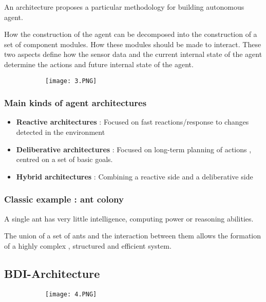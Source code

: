 \documentclass{article}
\begin{document}
An architecture proposes a particular methodology for building autonomous agent.

How the construction of the agent can be decomposed into the construction of a set of component modules.
How these modules should be made to interact.
These two aspects define how the sensor data and the current internal state of the agent determine the actions and future internal state of the agent.

\begin{figure}[ht!]
  \centering
  \begin{subfigure}[b]{0.6\linewidth}
    \texttt{[image: 3.PNG]}
  \end{subfigure}
\end{figure}

\subsubsection{Main kinds of agent architectures}

\begin{itemize}
    \item \textbf{Reactive architectures} : Focused on fast reactions/response to changes detected in the environment
    \item \textbf{Deliberative architectures} : Focused on long-term planning of actions , centred on a set of basic goals.
    \item \textbf{Hybrid architectures} : Combining a reactive side and a deliberative side
\end{itemize}

\subsubsection{Classic example : ant colony}

A single ant has very little intelligence, computing power or reasoning abilities.

The union of a set of ants and the interaction between them allows the formation of a highly complex , structured and efficient system.

\vspace{30mm}

\subsection{BDI-Architecture}

\begin{figure}[ht!]
  \centering
  \begin{subfigure}[b]{0.6\linewidth}
    \texttt{[image: 4.PNG]}
  \end{subfigure}
\end{figure}
\end{document}
